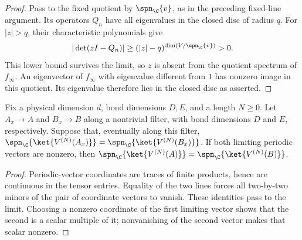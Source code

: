 \begin{proof}\leanok
    Pass to the fixed quotient by $\spn_{\C}\{v\}$, as in the preceding
    fixed-line argument. Its operators $Q_n$ have all eigenvalues in
    the closed disc of radius $q$. For $|z|>q$, their characteristic
    polynomials give
    \begin{align}
        |\det(zI-Q_n)|\geq(|z|-q)^{\dim(V/\spn_{\C}\{v\})}>0.\notag
    \end{align}
    This lower bound survives the limit, so $z$ is absent from the
    quotient spectrum of $f_\infty$. An eigenvector of $f_\infty$ with
    eigenvalue different from $1$ has nonzero image in this quotient.
    Its eigenvalue therefore lies in the closed disc as asserted.
\end{proof}

\begin{lemma}
    \label{thm:spc_aux_periodic_line_limit}
    \leanok
    Fix a physical dimension $d$, bond dimensions $D,E$, and a length
    $N\geq 0$. Let $A_x\to A$ and $B_x\to B$ along a nontrivial filter,
    with bond dimensions $D$ and $E$, respectively. Suppose that,
    eventually along this filter,
    $\spn_{\C}\{\ket{V^{(N)}(A_x)}\}
        =\spn_{\C}\{\ket{V^{(N)}(B_x)}\}$.
    If both limiting periodic vectors are nonzero, then
    $\spn_{\C}\{\ket{V^{(N)}(A)}\}
        =\spn_{\C}\{\ket{V^{(N)}(B)}\}$.
\end{lemma}

\begin{proof}\leanok
    Periodic-vector coordinates are traces of finite products, hence
    are continuous in the tensor entries. Equality of the two lines
    forces all two-by-two minors of the pair of coordinate vectors to
    vanish. These identities pass to the limit. Choosing a nonzero
    coordinate of the first limiting vector shows that the second is
    a scalar multiple of it; nonvanishing of the second vector makes
    that scalar nonzero.
\end{proof}

